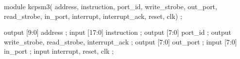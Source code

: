 \begin{vcode}
module kcpsm3(
        address,
        instruction,
        port_id,
        write_strobe,
        out_port,
        read_strobe,
        in_port,
        interrupt,
        interrupt_ack,
        reset,
        clk) ;
 
output  [9:0]   address ;
input   [17:0]  instruction ;
output  [7:0]   port_id ;
output          write_strobe, read_strobe, interrupt_ack ;
output  [7:0]   out_port ;
input   [7:0]   in_port ;
input           interrupt, reset, clk ;
\end{vcode}
